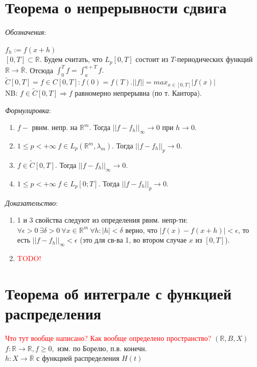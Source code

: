 \documentclass[paper=a4, fontsize=17pt]{article}
\begin{document}
\section{Теорема о непрерывности сдвига}
\emph{Обозначения}:

$f_h := f(x+h)$ \\
$[0, T] \subset \mathbb{R}$. Будем считать, что $L_p[0, T]$ состоит из $T$-периодических функций $\mathbb{R} \rightarrow \overline {\mathbb{R}}$. Отсюда $\int_{0}^{T} f = \int_{a}^{a+T} f.$ \\
$\widetilde{C}[0, T] = {f \in C[0, T]: f(0) = f(T) }. ||f|| = max_{x\in[0,T]}|f(x)|$ \\
NB: $f \in \widetilde{C}[0, T] \Rightarrow f$ равномерно непрерывна (по т. Кантора).

\emph{Формулировка}:
\begin{enumerate}
	\item $f - $ рвнм. непр. на $\mathbb{R}^m$. Тогда $||f-f_h||_\infty \rightarrow 0$ при $h\rightarrow 0$.
	\item $1 \leq p < + \infty \ f \in L_p(\mathbb{R}^m, \lambda_m)$. Тогда $||f-f_h||_p \rightarrow 0$.
	\item $f \in \widetilde{C}[0, T]$. Тогда $||f-f_h||_\infty \rightarrow 0$.
	\item $1 \leq p < + \infty \  f \in L_p[0; T]$. Тогда $||f-f_h||_p \rightarrow 0$.
\end{enumerate}

\emph{Доказательство}:

\begin{enumerate}
	\item 1 и 3 свойства следуют из определения рвнм. непр-ти:
		$\forall \epsilon > 0 \ \exists \delta > 0 \  \forall x \in \mathbb{R}^m \ \forall h: |h| < \delta$ верно, что $|f(x) - f(x+h)| < \epsilon$, то есть $||f-f_h||_\infty < \epsilon$
		(это для св-ва 1, во втором случае $x$ из $[0,T]$).
	\item \textcolor{red}{TODO!}
\end{enumerate}

\section{Теорема об интеграле с функцией распределения}
\textcolor{red}{Что тут вообще написано? Как вообще определено пространство?}
$(\mathbb{R}, B, X)$ \\
$f:\mathbb{R}\rightarrow\mathbb{R}, f \ge 0,$ изм. по Борелю, п.в. конечн.\\
$h: X \rightarrow \overline{\mathbb{R}}$ с функцией распределения $H(t)$\\
\end{document}
